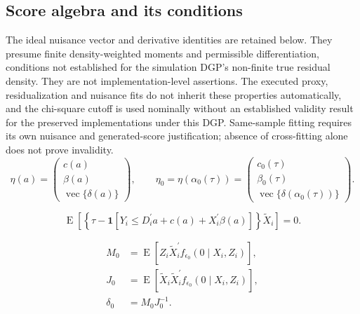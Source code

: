 \subsection{Score algebra and its conditions}
\label{app:score-algebra}
The ideal nuisance vector and derivative identities are retained below. They presume finite density-weighted moments and permissible differentiation, conditions not established for the simulation DGP's non-finite true residual density. They are not implementation-level assertions. The executed proxy, residualization and nuisance fits do not inherit these properties automatically, and the chi-square cutoff is used nominally without an established validity result for the preserved implementations under this DGP. Same-sample fitting requires its own nuisance and generated-score justification; absence of cross-fitting alone does not prove invalidity.
\begin{equation}
    \eta(a)
    =
    \begin{pmatrix}
        c(a)\\
        \beta(a)\\
        \operatorname{vec}\{\delta(a)\}
    \end{pmatrix},
    \qquad
    \eta_0
    =
    \eta\!\left(\alpha_0(\tau)\right)
    =
    \begin{pmatrix}
        c_0(\tau)\\
        \beta_0(\tau)\\
        \operatorname{vec}\{\delta(\alpha_0(\tau))\}
    \end{pmatrix}.
    \label{eq:profile-eta}
\end{equation}

\begin{equation}
    \operatorname{E}\!\left[
        \left\{
            \tau-\mathbf{1}\!\left[
                Y_i\leq D_i^{\prime}a+c(a)+X_i^{\prime}\beta(a)
            \right]
        \right\}\widetilde X_i
    \right]
    =0.
    \label{eq:profile-beta-moment}
\end{equation}

\begin{equation}
    \begin{aligned}
        M_0
        &=\operatorname{E}\!\left[
            Z_i\widetilde X_i^{\prime}
            f_{\epsilon_0}(0\mid X_i,Z_i)
        \right],\\
        J_0
        &=\operatorname{E}\!\left[
            \widetilde X_i\widetilde X_i^{\prime}
            f_{\epsilon_0}(0\mid X_i,Z_i)
        \right],\\
        \delta_0&=M_0J_0^{-1}.
    \end{aligned}
    \label{eq:orthogonality-MJ}
\end{equation}

